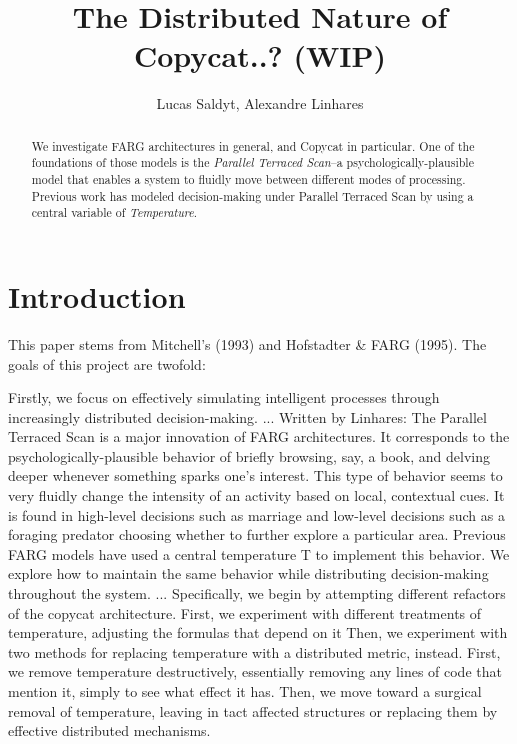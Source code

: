 \documentclass[a4paper]{article}
\title{The Distributed Nature of Copycat..? (WIP)}
\author{Lucas Saldyt, Alexandre Linhares}
\begin{document}
\maketitle

\begin{abstract}
We investigate FARG architectures in general, and Copycat in particular.  One of the foundations of those models is the \emph{Parallel Terraced Scan}--a psychologically-plausible model that enables a system to fluidly move between different modes of processing.  Previous work has modeled decision-making under Parallel Terraced Scan by using a central variable of \emph{Temperature}. 

\end{abstract}

\section{Introduction}

    This paper stems from Mitchell's (1993) and Hofstadter \& FARG (1995). The goals of this project are twofold:

    Firstly, we focus on effectively simulating intelligent processes through increasingly distributed decision-making.
    ...
    Written by Linhares:
    The Parallel Terraced Scan is a major innovation of FARG architectures. 
    It corresponds to the psychologically-plausible behavior of briefly browsing, say, a book, and delving deeper whenever something sparks one's interest. 
    This type of behavior seems to very fluidly change the intensity of an activity based on local, contextual cues. 
    It is found in high-level decisions such as marriage and low-level decisions such as a foraging predator choosing whether to further explore a particular area. 
    Previous FARG models have used a central temperature T to implement this behavior. 
    We explore how to maintain the same behavior while distributing decision-making throughout the system.
    ...
    Specifically, we begin by attempting different refactors of the copycat architecture.
    First, we experiment with different treatments of temperature, adjusting the formulas that depend on it
    Then, we experiment with two methods for replacing temperature with a distributed metric, instead.
    First, we remove temperature destructively, essentially removing any lines of code that mention it, simply to see what effect it has.
    Then, we move toward a surgical removal of temperature, leaving in tact affected structures or replacing them by effective distributed mechanisms.
\end{document}
